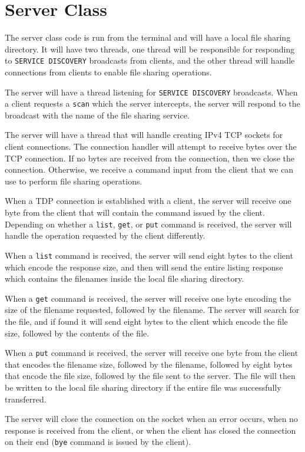 \section*{Server Class}
The server class code is run from the terminal and will have a local file sharing directory. It will have two threads, one thread will be responsible for responding to \texttt{SERVICE DISCOVERY} broadcasts from clients, and the other thread will handle connections from clients to enable file sharing operations.

The server will have a thread listening for \texttt{SERVICE DISCOVERY} broadcasts. When a client requests a \texttt{scan} which the server intercepts, the server will respond to the broadcast with the name of the file sharing service.

The server will have a thread that will handle creating IPv4 TCP sockets for client connections. The connection handler will attempt to receive bytes over the TCP connection. If no bytes are received from the connection, then we close the connection. Otherwise, we receive a command input from the client that we can use to perform file sharing operations.

When a TDP connection is established with a client, the server will receive one byte from the client that will contain the command issued by the client. Depending on whether a \texttt{list}, \texttt{get}, or \texttt{put} command is received, the server will handle the operation requested by the client differently.

When a \texttt{list} command is received, the server will send eight bytes to the client which encode the response size, and then will send the entire listing response which contains the filenames inside the local file sharing directory.

When a \texttt{get} command is received, the server will receive one byte encoding the size of the filename requested, followed by the filename. The server will search for the file, and if found it will send eight bytes to the client which encode the file size, followed by the contents of the file.

When a \texttt{put} command is received, the server will receive one byte from the client that encodes the filename size, followed by the filename, followed by eight bytes that encode the file size, followed by the file sent to the server. The file will then be written to the local file sharing directory if the entire file was successfully transferred.

The server will close the connection on the socket when an error occurs, when no response is received from the client, or when the client has closed the connection on their end (\texttt{bye} command is issued by the client).
